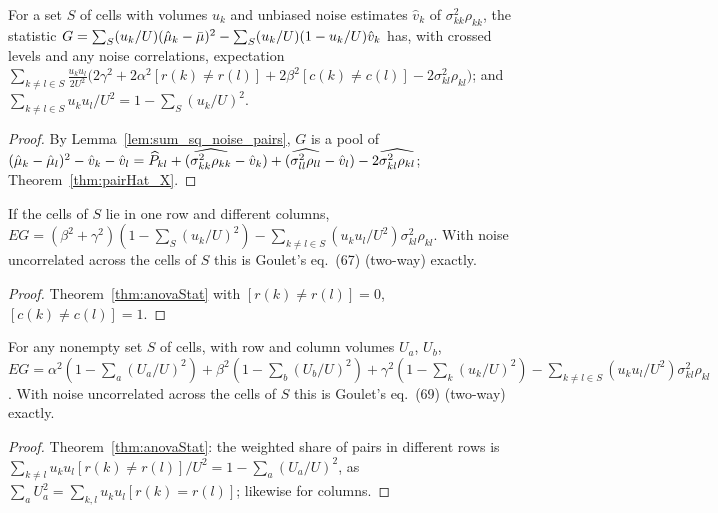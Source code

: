\begin{theorem}\label{thm:anovaStat}
  \leanok
  For a set $S$ of cells with volumes $u_k$ and unbiased noise estimates $\hat v_k$ of
  $\sigma^2_{kk}\rho_{kk}$, the statistic $G = \sum_S (u_k/U)(\hat\mu_k - \bar\mu)^2 -
  \sum_S (u_k/U)(1 - u_k/U)\hat v_k$ has, with crossed levels and any noise correlations,
  expectation $\sum_{k \ne l \in S} \frac{u_ku_l}{2U^2}\bigl(2\gamma^2 + 2\alpha^2[r(k) \ne r(l)]
  + 2\beta^2[c(k) \ne c(l)] - 2\sigma^2_{kl}\rho_{kl}\bigr)$; and
  $\sum_{k \ne l \in S} u_ku_l/U^2 = 1 - \sum_S (u_k/U)^2$.
\end{theorem}
\begin{proof}
  \leanok
  By Lemma~\ref{lem:sum_sq_noise_pairs}, $G$ is a pool of $(\hat\mu_k - \hat\mu_l)^2 - \hat v_k - \hat v_l
  = \widehat P_{kl} + (\widehat{\sigma^2_{kk}\rho_{kk}} - \hat v_k)
  + (\widehat{\sigma^2_{ll}\rho_{ll}} - \hat v_l) - 2\widehat{\sigma^2_{kl}\rho_{kl}}$;
  Theorem~\ref{thm:pairHat_X}.
\end{proof}

\begin{theorem}\label{thm:anovaStat_row}
  \leanok
  If the cells of $S$ lie in one row and different columns,
  $E G = (\beta^2 + \gamma^2)(1 - \sum_S (u_k/U)^2) - \sum_{k \ne l \in S}(u_ku_l/U^2)
  \sigma^2_{kl}\rho_{kl}$. With noise uncorrelated across the cells of $S$ this is Goulet's
  eq.~(67) (two-way) exactly.
\end{theorem}
\begin{proof}
  \leanok
  Theorem~\ref{thm:anovaStat} with $[r(k) \ne r(l)] = 0$, $[c(k) \ne c(l)] = 1$.
\end{proof}

\begin{theorem}\label{thm:anovaStat_grand}
  \leanok
  For any nonempty set $S$ of cells, with row and column volumes $U_a$, $U_b$,
  $E G = \alpha^2(1 - \sum_a (U_a/U)^2) + \beta^2(1 - \sum_b (U_b/U)^2) + \gamma^2(1 - \sum_k
  (u_k/U)^2) - \sum_{k \ne l \in S}(u_ku_l/U^2)\sigma^2_{kl}\rho_{kl}$. With noise uncorrelated
  across the cells of $S$ this is Goulet's eq.~(69) (two-way) exactly.
\end{theorem}
\begin{proof}
  \leanok
  Theorem~\ref{thm:anovaStat}: the weighted share of pairs in different rows is
  $\sum_{k \ne l}u_ku_l[r(k) \ne r(l)]/U^2 = 1 - \sum_a (U_a/U)^2$, as
  $\sum_a U_a^2 = \sum_{k,l}u_ku_l[r(k) = r(l)]$; likewise for columns.
\end{proof}

